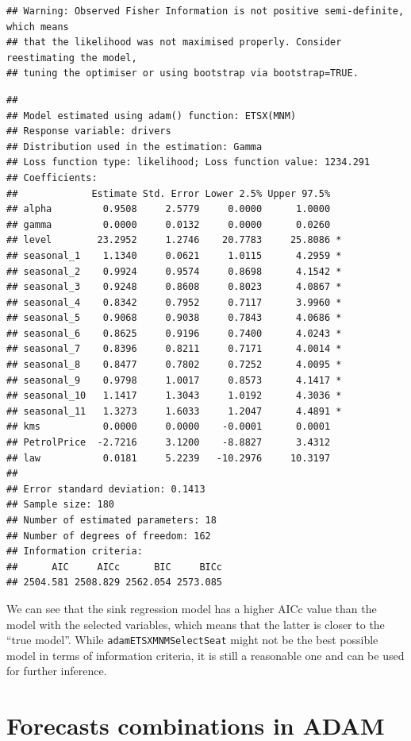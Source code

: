 \documentclass[
]{book}
\theoremstyle{definition}
\theoremstyle{definition}
\theoremstyle{definition}
\theoremstyle{definition}
\theoremstyle{remark}
\begin{document}
\begin{verbatim}
## Warning: Observed Fisher Information is not positive semi-definite, which means
## that the likelihood was not maximised properly. Consider reestimating the model,
## tuning the optimiser or using bootstrap via bootstrap=TRUE.
\end{verbatim}

\begin{verbatim}
## 
## Model estimated using adam() function: ETSX(MNM)
## Response variable: drivers
## Distribution used in the estimation: Gamma
## Loss function type: likelihood; Loss function value: 1234.291
## Coefficients:
##             Estimate Std. Error Lower 2.5% Upper 97.5%  
## alpha         0.9508     2.5779     0.0000      1.0000  
## gamma         0.0000     0.0132     0.0000      0.0260  
## level        23.2952     1.2746    20.7783     25.8086 *
## seasonal_1    1.1340     0.0621     1.0115      4.2959 *
## seasonal_2    0.9924     0.9574     0.8698      4.1542 *
## seasonal_3    0.9248     0.8608     0.8023      4.0867 *
## seasonal_4    0.8342     0.7952     0.7117      3.9960 *
## seasonal_5    0.9068     0.9038     0.7843      4.0686 *
## seasonal_6    0.8625     0.9196     0.7400      4.0243 *
## seasonal_7    0.8396     0.8211     0.7171      4.0014 *
## seasonal_8    0.8477     0.7802     0.7252      4.0095 *
## seasonal_9    0.9798     1.0017     0.8573      4.1417 *
## seasonal_10   1.1417     1.3043     1.0192      4.3036 *
## seasonal_11   1.3273     1.6033     1.2047      4.4891 *
## kms           0.0000     0.0000    -0.0001      0.0001  
## PetrolPrice  -2.7216     3.1200    -8.8827      3.4312  
## law           0.0181     5.2239   -10.2976     10.3197  
## 
## Error standard deviation: 0.1413
## Sample size: 180
## Number of estimated parameters: 18
## Number of degrees of freedom: 162
## Information criteria:
##      AIC     AICc      BIC     BICc 
## 2504.581 2508.829 2562.054 2573.085
\end{verbatim}

We can see that the sink regression model has a higher AICc value than the model with the selected variables, which means that the latter is closer to the ``true model''. While \texttt{adamETSXMNMSelectSeat} might not be the best possible model in terms of information criteria, it is still a reasonable one and can be used for further inference.

\hypertarget{ADAMCombinations}{%
\section{Forecasts combinations in ADAM}\label{ADAMCombinations}}
\end{document}
